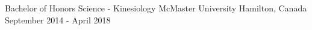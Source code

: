 
\begin{cventries}
  \cventry
    {Bachelor of Honors Science - Kinesiology}
    {McMaster University}
    {Hamilton, Canada}
    {September 2014 - April 2018}
    {}
\end{cventries}
